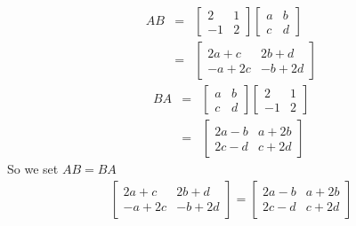 \begin{enumerate}
\begin{eqnarray*} AB &=& \left[ \begin{array}{rr}
                           2&1\\
                           -1&2\end{array} \right]
\left[ \begin{array}{rr}   a&b\\
                           c&d\end{array} \right]
\\
&=& \left[ \begin{array}{rr}
                           2a+c&2b+d\\
                           -a+2c&-b+2d\end{array} \right]
\end{eqnarray*}
\begin{eqnarray*} BA &=& \left[ \begin{array}{rr}
                           a&b\\
                           c&d\end{array} \right]
\left[ \begin{array}{rrr}
                          2&1\\
                          -1&2\end{array} \right]
\\
&=& \left[ \begin{array}{rr}
                           2a-b&a+2b\\
                           2c-d&c+2d\end{array} \right]
\end{eqnarray*}
\noindent So we set $AB=BA$\\
\begin{eqnarray*}
\left[ \begin{array}{rr}   2a+c&2b+d\\
                           -a+2c&-b+2d\end{array} \right]
=\left[ \begin{array}{rr}
                           2a-b&a+2b\\
                           2c-d&c+2d\end{array} \right]
\end{eqnarray*}


\end{enumerate}
